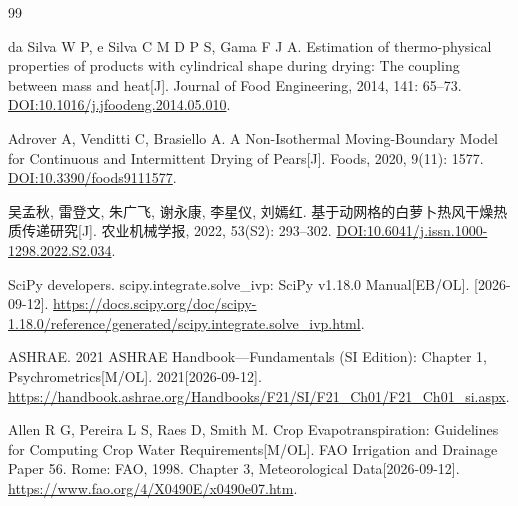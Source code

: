 \begin{thebibliography}{99}
\small
\setlength{\itemsep}{1pt}
\setlength{\parsep}{0pt}
\setlength{\parskip}{0pt}

da Silva W P, e Silva C M D P S, Gama F J A.
Estimation of thermo-physical properties of products with cylindrical shape
during drying: The coupling between mass and heat[J].
Journal of Food Engineering, 2014, 141: 65--73.
\href{https://doi.org/10.1016/j.jfoodeng.2014.05.010}{DOI:10.1016/j.jfoodeng.2014.05.010}.

Adrover A, Venditti C, Brasiello A.
A Non-Isothermal Moving-Boundary Model for Continuous and Intermittent
Drying of Pears[J]. Foods, 2020, 9(11): 1577.
\href{https://doi.org/10.3390/foods9111577}{DOI:10.3390/foods9111577}.

吴孟秋, 雷登文, 朱广飞, 谢永康, 李星仪, 刘嫣红.
基于动网格的白萝卜热风干燥热质传递研究[J].
农业机械学报, 2022, 53(S2): 293--302.
\href{https://doi.org/10.6041/j.issn.1000-1298.2022.S2.034}{DOI:10.6041/j.issn.1000-1298.2022.S2.034}.

SciPy developers.
scipy.integrate.solve\_ivp: SciPy v1.18.0 Manual[EB/OL]. [2026-09-12].
\url{https://docs.scipy.org/doc/scipy-1.18.0/reference/generated/scipy.integrate.solve_ivp.html}.

ASHRAE.
2021 ASHRAE Handbook---Fundamentals (SI Edition):
Chapter 1, Psychrometrics[M/OL]. 2021[2026-09-12].
\url{https://handbook.ashrae.org/Handbooks/F21/SI/F21_Ch01/F21_Ch01_si.aspx}.

Allen R G, Pereira L S, Raes D, Smith M.
Crop Evapotranspiration: Guidelines for Computing Crop Water Requirements[M/OL].
FAO Irrigation and Drainage Paper 56. Rome: FAO, 1998.
Chapter 3, Meteorological Data[2026-09-12].
\url{https://www.fao.org/4/X0490E/x0490e07.htm}.

\end{thebibliography}

